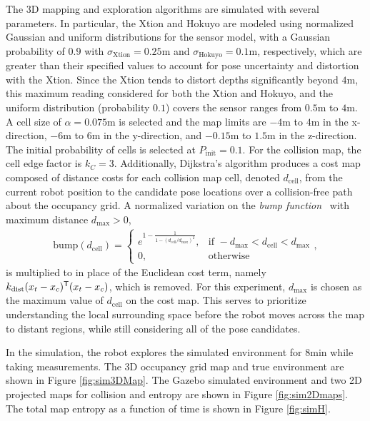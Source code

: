 The 3D mapping and exploration algorithms are simulated with several parameters.  In particular, the Xtion and Hokuyo are modeled using normalized Gaussian and uniform distributions for the sensor model, with a Gaussian probability of $0.9$ with $\sigma_\text{Xtion}=0.25$m and $\sigma_\text{Hokuyo}=0.1$m, respectively, which are greater than their specified values to account for pose uncertainty and distortion with the Xtion. Since the Xtion tends to distort depths significantly beyond $4$m, this maximum reading considered for both the Xtion and Hokuyo, and the uniform distribution (probability $0.1$) covers the sensor ranges from $0.5$m to $4$m. A cell size of $\alpha=0.075$m is selected and the map limits are $-4$m to $4$m in the x-direction, $-6$m to $6$m in the y-direction, and $-0.15$m to $1.5$m in the z-direction. The initial probability of cells is selected at $P_\text{init}=0.1$. For the collision map, the cell edge factor is $k_C=3$. Additionally, Dijkstra's algorithm produces a cost map composed of distance costs for each collision map cell, denoted $d_\text{cell}$, from the current robot position to the candidate pose locations over a collision-free path about the occupancy grid. A normalized variation on the \emph{bump function}~\cite{Joh06} with maximum distance $d_\text{max}>0$,%
\begin{align}
\label{eqn:bumpFun}
\text{bump}(d_\text{cell})= 
\begin{cases}
    e^{1-\frac1{1-(d_\text{cell}/d_\text{max})^2}},			& \text{if }-d_\text{max}<d_\text{cell}<d_\text{max}\\
    0,              				& \text{otherwise}
\end{cases},
\end{align}
is multiplied to  in place of the Euclidean cost term, namely $k_\text{dist}(x_t-x_c)^{\mathsf{T}}(x_t-x_c)$, which is removed. For this experiment, $d_\text{max}$ is chosen as the maximum value of $d_\text{cell}$ on the cost map. This serves to prioritize understanding the local surrounding space before the robot moves across the map to distant regions, while still considering all of the pose candidates.

In the simulation, the robot explores the simulated environment for $8$min while taking measurements. The 3D occupancy grid map and true environment are shown in Figure \ref{fig:sim3DMap}. The Gazebo simulated environment and two 2D projected maps for collision and entropy are shown in Figure \ref{fig:sim2Dmaps}. The total map entropy as a function of time is shown in Figure \ref{fig:simH}.


